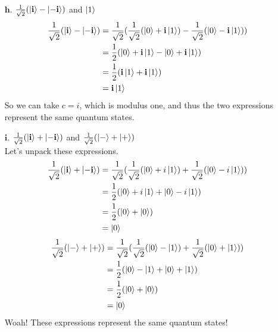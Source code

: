 \documentclass[11pt]{article}
\def\bfi{\ensuremath\textbf{i}}
\def\srtt{\ensuremath\frac{1}{\sqrt{2}}}
\begin{document}
\begin{enumerate}
\item[$\textbf{h.}$] 
	$\frac{1}{\sqrt{2}}(\ket{\textbf{i}} - \ket{-\textbf{i}})$ and $\ket{1}$
	\begin{align*}
	\frac{1}{\sqrt{2}}(\ket{\bfi} - \ket{-\textbf{i}})
		&= \srtt(\srtt(\ket{0} + \bfi\ket{1}) - \srtt(\ket{0} - \bfi\ket{1})) \\
		&= \frac{1}{2}(\ket{0} + \bfi\ket{1} - \ket{0} + \bfi\ket{1}) \\
		&= \frac{1}{2}(\bfi\ket{1}  + \bfi\ket{1}) \\
		&= \bfi\ket{1} 
	\end{align*}
	So we can take $c = i$, which is modulus one, and thus the two expressions 
	represent the same quantum states. 
\newpage
\item[$\textbf{i.}$] 
	$\frac{1}{\sqrt{2}}(\ket{\textbf{i}} + \ket{-\textbf{i}})$ and 
		$\frac{1}{\sqrt{2}}(\ket{-} + \ket{+})$ \\
	Let's unpack these expressions.
	\begin{align*}
	\srtt(\ket{\bfi} + \ket{-\bfi}) 
		&= \srtt(\srtt(\ket{0} + i \ket{1}) + \srtt(\ket{0} - i \ket{1})) \\
		&= \frac{1}{2}(\ket{0} + i \ket{1} + \ket{0} - i \ket{1}) \\
		&= \frac{1}{2}(\ket{0} + \ket{0}) \\
		&= \ket{0} 
	\end{align*}
	\begin{align*}
	\srtt(\ket{-} + \ket{+})
		&= \srtt(\srtt(\ket{0} - \ket{1}) + \srtt(\ket{0} + \ket{1})) \\
		&= \frac{1}{2}(\ket{0} - \ket{1} + \ket{0} + \ket{1}) \\
		&= \frac{1}{2}(\ket{0} + \ket{0}) \\
		&= \ket{0}
	\end{align*}
	Woah! These expressions represent the same quantum states!



\end{enumerate}
\end{document}
